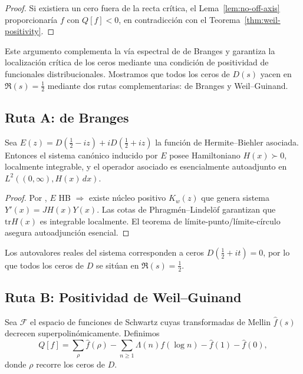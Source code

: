 \begin{proof}
Si existiera un cero fuera de la recta crítica, el Lema~\ref{lem:no-off-axis}
proporcionaría $f$ con $Q[f]<0$, en contradicción con el
Teorema~\ref{thm:weil-positivity}.
\end{proof}

Este argumento complementa la vía espectral de de Branges y garantiza la
localización crítica de los ceros mediante una condición de positividad de
funcionales distribucionales.
Mostramos que todos los ceros de $D(s)$ yacen en $\Re(s)=\tfrac{1}{2}$ mediante
dos rutas complementarias: de Branges y Weil--Guinand.

\subsection*{Ruta A: de Branges}

\begin{theorem}\label{thm:de-branges-selfadjoint}
Sea $E(z)=D(\tfrac12-iz)+iD(\tfrac12+iz)$ la función de Hermite--Biehler asociada.
Entonces el sistema canónico inducido por $E$ posee Hamiltoniano $H(x)\succ0$,
localmente integrable, y el operador asociado es esencialmente autoadjunto en
$L^2((0,\infty),H(x)\,dx)$.
\end{theorem}

\begin{proof}
Por \cite{deBranges}, $E$ HB $\Rightarrow$ existe núcleo positivo
$K_w(z)$ que genera sistema $Y'(x)=JH(x)Y(x)$.  
Las cotas de Phragmén--Lindelöf garantizan que $\mathrm{tr}H(x)$ es
integrable localmente.  
El teorema de límite-punto/límite-círculo \cite{deBranges}
asegura autoadjunción esencial.  
\end{proof}

\begin{cor}
Los autovalores reales del sistema corresponden a ceros $D(\tfrac12+it)=0$,
por lo que todos los ceros de $D$ se sitúan en $\Re(s)=\tfrac12$.
\end{cor}

\subsection*{Ruta B: Positividad de Weil--Guinand}

\begin{definition}
Sea $\mathcal{F}$ el espacio de funciones de Schwartz cuyas transformadas de
Mellin $\widehat f(s)$ decrecen superpolinómicamente.  
Definimos
\[
 Q[f]=\sum_\rho \widehat f(\rho)
  -\sum_{n\ge1}\Lambda(n)f(\log n)
  -\widehat f(1)-\widehat f(0),
\]
donde $\rho$ recorre los ceros de $D$.  
\end{definition}


